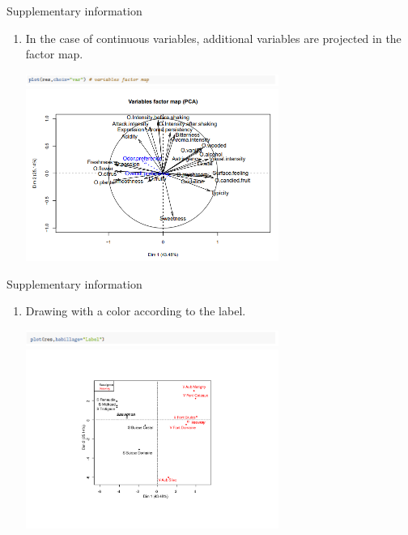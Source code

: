 \documentclass[9pt]{beamer}
\begin{document}
\begin{frame}{Supplementary information}

\begin{enumerate}[-]

\item In the case of continuous variables,  \textcolor{lighto}{additional variables are projected in the factor map}.

\begin{center}
\includegraphics[width=0.65\textwidth]{pca_supp_3}\\
\includegraphics[width=0.65\textwidth]{pca_supp_4}
\end{center}

\end{enumerate}

\end{frame}

\begin{frame}{Supplementary information}

\begin{enumerate}[-]

\item Drawing with a color  \textcolor{lighto}{according to the label}.

\begin{center}
\includegraphics[width=0.65\textwidth]{pca_supp_5}\\
\includegraphics[width=0.65\textwidth]{./wine_PCA_ind_mod_coul.pdf}
\end{center}

\end{enumerate}

\end{frame}
\end{document}
